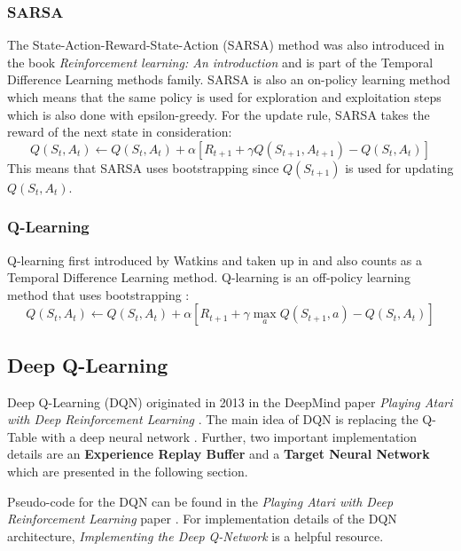 \documentclass[conference]{IEEEtran}
\begin{document}
\subsubsection{SARSA}
The State-Action-Reward-State-Action (SARSA) method was also introduced in the book \textit{Reinforcement learning: An introduction} \cite{b4} and is part of the Temporal Difference Learning methods family.
SARSA is also an on-policy learning method which means that the same policy is used for exploration and exploitation steps which is also done with epsilon-greedy.  
For the update rule, SARSA takes the reward of the next state in consideration:
\begin{equation*}
	Q(S_t, A_t) \leftarrow Q(S_t, A_t) + \alpha [R_{t+1} + \gamma Q(S_{t+1}, A_{t+1}) - Q(S_t, A_t)] \tag{2}
\end{equation*}
This means that SARSA uses bootstrapping since $Q(S_{t+1})$ is used for updating $Q(S_t, A_t)$. 

\subsubsection{Q-Learning}
Q-learning first introduced by Watkins \cite{b5} and taken up in \cite{b4} and also counts as a Temporal Difference Learning method.
Q-learning is an off-policy learning method that uses bootstrapping \cite{b4}:
\begin{equation*}
	Q(S_t, A_t) \leftarrow Q(S_t, A_t) + \alpha [R_{t+1} + \gamma \max_a Q(S_{t+1}, a) - Q(S_t, A_t)] \tag{3}
\end{equation*}


\subsection{Deep Q-Learning}
Deep Q-Learning (DQN) originated in 2013 in the DeepMind paper \textit{Playing Atari with Deep Reinforcement Learning} \cite{b2}.
The main idea of DQN is replacing the Q-Table with a deep neural network \cite{b2}. 
Further, two important implementation details are an \textbf{Experience Replay Buffer} and a \textbf{Target Neural Network} which are presented in the following section.

Pseudo-code for the DQN can be found in the \textit{Playing Atari with Deep Reinforcement Learning} paper \cite{b2}.
For implementation details of the DQN architecture, \textit{Implementing the Deep Q-Network} \cite{b6} is a helpful resource. 
\end{document}
